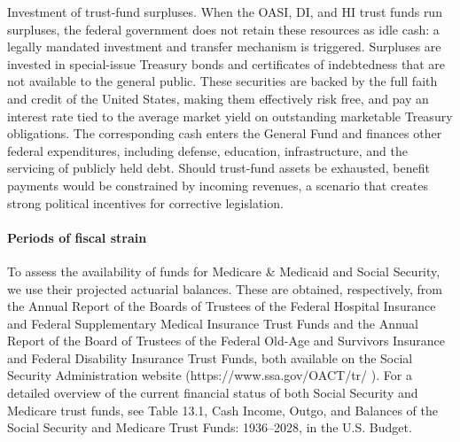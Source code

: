 \documentclass[12pt]{article}%
\theoremstyle{remark}
\begin{document}
Investment of trust-fund surpluses. When the OASI, DI, and HI trust funds run surpluses, the federal government does not retain these resources as idle cash: a legally mandated investment and transfer mechanism is triggered. Surpluses are invested in special-issue Treasury bonds and certificates of indebtedness that are not available to the general public. These securities are backed by the full faith and credit of the United States, making them effectively risk free, and pay an interest rate tied to the average market yield on outstanding marketable Treasury obligations. The corresponding cash enters the General Fund and finances other federal expenditures, including defense, education, infrastructure, and the servicing of publicly held debt. Should trust-fund assets be exhausted, benefit payments would be constrained by incoming revenues, a scenario that creates strong political incentives for corrective legislation.
\paragraph{Periods of fiscal strain}
To assess the availability of funds for Medicare \& Medicaid and Social Security, we use their projected actuarial balances. These are obtained, respectively, from the Annual Report of the Boards of Trustees of the Federal Hospital Insurance and Federal Supplementary Medical Insurance Trust Funds and the Annual Report of the Board of Trustees of the Federal Old-Age and Survivors Insurance and Federal Disability Insurance Trust Funds, both available on the Social Security Administration website (https://www.ssa.gov/OACT/tr/
). For a detailed overview of the current financial status of both Social Security and Medicare trust funds, see Table 13.1, Cash Income, Outgo, and Balances of the Social Security and Medicare Trust Funds: 1936–2028, in the U.S. Budget.

\end{document}
